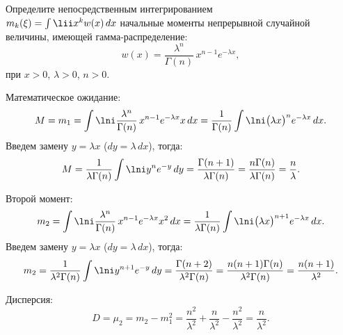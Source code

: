 \documentclass[pscyr]{hedwork}
\begin{document}
  \maketitle

  \begin{task}{4}{
    Определите непосредственным интегрированием \\
    \( m_k(\xi) = \int\lii x^k w(x)\,dx \) начальные моменты непрерывной
    случайной величины, имеющей гамма-распределение:
    \[
      w(x) = \frac{\lambda^n}{\Gamma(n)}\,x^{n - 1} e^{-\lambda x},
    \]
    при \( x > 0 \), \( \lambda > 0 \), \( n > 0 \).
  }

    Математическое ожидание:
    \[
      M = m_1 = \int\lni \frac{\lambda^n}{\Gamma(n)}\,x^{n - 1} e^{-\lambda x}
        x\,dx = \frac{1}{\Gamma(n)} \int\lni \bigl(\lambda x\big)^n
        e^{-\lambda x}\,dx.
    \]
    Введем замену \( y = \lambda x \) (\( dy = \lambda\,dx \)), тогда:
    \[
      M = \frac{1}{\lambda\Gamma(n)} \int\lni y^n e^{-y}\,dy =
        \frac{\Gamma(n + 1)}{\lambda\Gamma(n)} =
        \frac{n\Gamma(n)}{\lambda\Gamma(n)} = \frac{n}{\lambda}.
    \]
    
    Второй момент:
    \[
      m_2 = \int\lni \frac{\lambda^n}{\Gamma(n)}\,x^{n - 1} e^{-\lambda x}
        x^2\,dx = \frac{1}{\lambda\Gamma(n)} \int\lni
        \bigl(\lambda x\big)^{n + 1} e^{-\lambda x}\,dx.
    \]
    Введем замену \( y = \lambda x \) (\( dy = \lambda\,dx \)), тогда:
    \[
      m_2 = \frac{1}{\lambda^2 \Gamma(n)} \int\lni y^{n + 1} e^{-y}\,dy =
        \frac{\Gamma(n + 2)}{\lambda^2\Gamma(n)} =
        \frac{n(n + 1)\Gamma(n)}{\lambda^2\Gamma(n)} =
        \frac{n(n + 1)}{\lambda^2}.
    \]
    
    Дисперсия:
    \[
      D = \mu_2 = m_2 - m_1^2 = \frac{n^2}{\lambda^2} + \frac{n}{\lambda^2} -
        \frac{n^2}{\lambda^2} = \frac{n}{\lambda^2}.
    \]
    
  \end{task}
\end{document}
